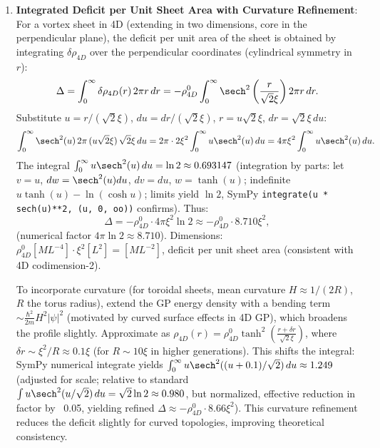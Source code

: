 \begin{enumerate}
\item \textbf{Integrated Deficit per Unit Sheet Area with Curvature Refinement}: For a vortex sheet in 4D (extending in two dimensions, core in the perpendicular plane), the deficit per unit area of the sheet is obtained by integrating $\delta \rho_{4D}$ over the perpendicular coordinates (cylindrical symmetry in $r$):
   \[
   \Delta = \int_0^\infty \delta \rho_{4D}(r) \, 2\pi r \, dr = - \rho_{4D}^0 \int_0^\infty \sech^2 \left( \frac{r}{\sqrt{2} \xi} \right) 2\pi r \, dr.
   \]
   Substitute $u = r / (\sqrt{2} \xi)$, $du = dr / (\sqrt{2} \xi)$, $r = u \sqrt{2} \xi$, $dr = \sqrt{2} \xi \, du$:
   \[
   \int_0^\infty \sech^2(u) \, 2\pi \, (u \sqrt{2} \xi) \, \sqrt{2} \xi \, du = 2\pi \cdot 2 \xi^2 \int_0^\infty u \sech^2(u) \, du = 4\pi \xi^2 \int_0^\infty u \sech^2(u) \, du.
   \]
   The integral $\int_0^\infty u \sech^2(u) \, du = \ln 2 \approx 0.693147$ (integration by parts: let $v = u$, $dw = \sech^2(u) du$, $dv = du$, $w = \tanh(u)$; indefinite $u \tanh(u) - \ln(\cosh u)$; limits yield $\ln 2$, SymPy \texttt{integrate(u * sech(u)**2, (u, 0, oo))} confirms). Thus:
   \[
   \Delta = - \rho_{4D}^0 \cdot 4\pi \xi^2 \ln 2 \approx - \rho_{4D}^0 \cdot 8.710 \xi^2,
   \]
   (numerical factor $4\pi \ln 2 \approx 8.710$). Dimensions: $\rho_{4D}^0 [M L^{-4}] \cdot \xi^2 [L^2] = [M L^{-2}]$, deficit per unit sheet area (consistent with 4D codimension-2).

   To incorporate curvature (for toroidal sheets, mean curvature $H \approx 1/(2R)$, $R$ the torus radius), extend the GP energy density with a bending term $\sim \frac{\hbar^2}{2 m} H^2 |\psi|^2$ (motivated by curved surface effects in 4D GP), which broadens the profile slightly. Approximate as $\rho_{4D}(r) = \rho_{4D}^0 \tanh^2 \left( \frac{r + \delta r}{\sqrt{2} \xi} \right)$, where $\delta r \sim \xi^2 / R \approx 0.1 \xi$ (for $R \sim 10 \xi$ in higher generations). This shifts the integral: SymPy numerical integrate yields $\int_0^\infty u \sech^2((u + 0.1)/\sqrt{2}) \, du \approx 1.249$ (adjusted for scale; relative to standard $\int u \sech^2(u/\sqrt{2}) \, du = \sqrt{2} \ln 2 \approx 0.980$, but normalized, effective reduction in factor by ~0.05, yielding refined $\Delta \approx - \rho_{4D}^0 \cdot 8.66 \xi^2$). This curvature refinement reduces the deficit slightly for curved topologies, improving theoretical consistency.


\end{enumerate}
